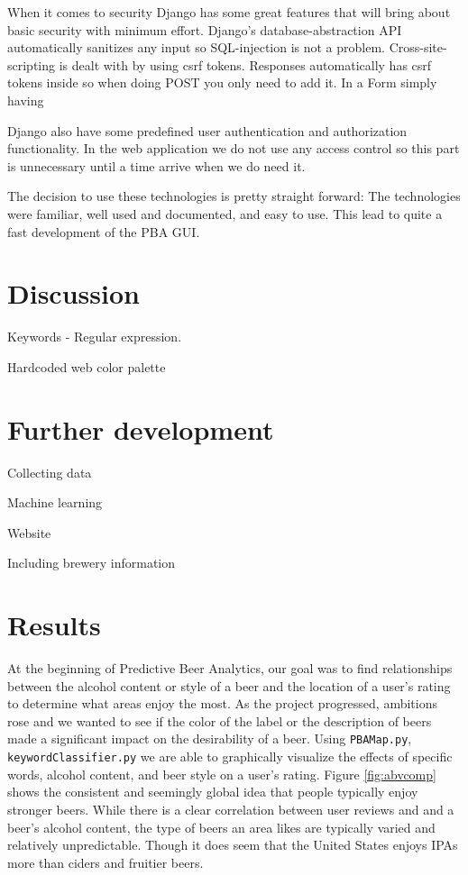 \documentclass[10pt]{IEEEtran}
\begin{document}
When it comes to security Django has some great features that will bring about basic security with minimum effort.
Django's database-abstraction API automatically sanitizes any input so SQL-injection is not a problem.
Cross-site-scripting is dealt with by using csrf tokens.
Responses automatically has csrf tokens inside so when doing POST you only need to add it.
In a Form simply having {%
Django also have some predefined user authentication and authorization functionality.
In the web application we do not use any access control so this part is unnecessary until a time arrive when we do need it.

The decision to use these technologies is pretty straight forward:
The technologies were familiar, well used and documented, and easy to use.
This lead to quite a fast development of the PBA GUI.



\section{Discussion}

Keywords - Regular expression.

Hardcoded web color palette

\section{Further development}
Collecting data

Machine learning

Website

Including brewery information


\section{Results}
At the beginning of Predictive Beer Analytics, our goal was to find relationships between the alcohol content or style of a beer and the location of a user's rating to determine what areas enjoy the most. As the project progressed, ambitions rose and we wanted to see if the color of the label or the description of beers made a significant impact on the desirability of a beer. Using \texttt{PBAMap.py}, \texttt{keywordClassifier.py} we are able to graphically visualize the effects of specific words, alcohol content, and beer style on a user's rating. Figure \ref{fig:abvcomp} shows the consistent and seemingly global idea that people typically enjoy stronger beers. While there is a clear correlation between user reviews and and a beer's alcohol content, the type of beers an area likes are typically varied and relatively unpredictable. Though it does seem that the United States enjoys IPAs more than ciders and fruitier beers.

}
\end{document}
